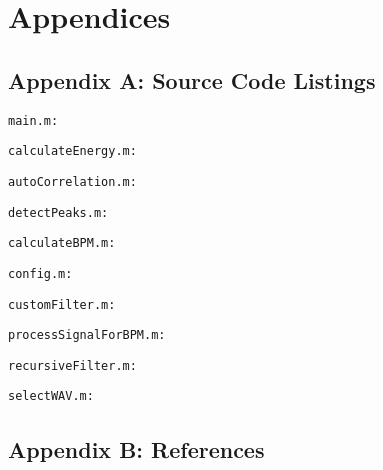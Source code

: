 \section{Appendices}

\subsection{Appendix A: Source Code Listings}

\texttt{main.m:}

\newpage

\texttt{calculateEnergy.m:}

\newpage

\texttt{autoCorrelation.m:}

\newpage

\texttt{detectPeaks.m:}

\newpage

\texttt{calculateBPM.m:}

\newpage

\texttt{config.m:}

\newpage

\texttt{customFilter.m:}

\newpage

\texttt{processSignalForBPM.m:}

\newpage

\texttt{recursiveFilter.m:}

\newpage

\texttt{selectWAV.m:}

\newpage

\subsection{Appendix B: References}

